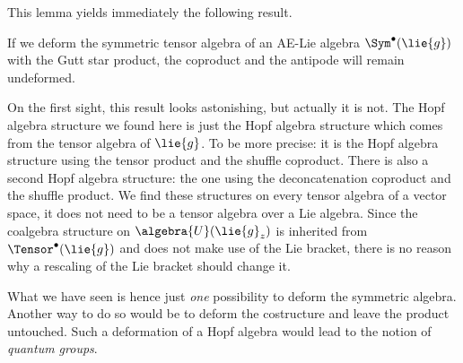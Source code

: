 This lemma yields immediately the following result.
\begin{corollary}
	If we deform the symmetric tensor algebra of an AE-Lie algebra 
	$\Sym^{\bullet}(\lie{g})$ with the Gutt star product, the coproduct 
	and the antipode will remain undeformed.
\end{corollary}
\begin{remark}
	\mbox{}
	\begin{remarklist}
		\item
		On the first sight, this result looks astonishing, but actually it is 
		not. The Hopf algebra structure we found here is just the Hopf algebra 
		structure which comes from the tensor algebra of $\lie{g}$. To be more 
		precise: it is the Hopf algebra structure using the tensor product and 
		the shuffle coproduct. There is also a second Hopf algebra structure: the 
		one using the deconcatenation coproduct and the shuffle product. We find 
		these structures on every tensor algebra of a vector space, it does not 
		need to be a tensor algebra over a Lie algebra. Since the coalgebra 
		structure on $\algebra{U}(\lie{g}_z)$ is inherited from 
		$\Tensor^{\bullet}(\lie{g})$ and does not make use of the Lie bracket, 
		there is no reason why a rescaling of the Lie bracket should change it.
		
		\item
		What we have seen is hence just \emph{one} possibility to deform the 
		symmetric algebra. Another way to do so would be to deform the 
		costructure and leave the product untouched. Such a deformation of a Hopf 
		algebra would lead to the notion of \emph{quantum groups}.
	\end{remarklist}
\end{remark}

%


